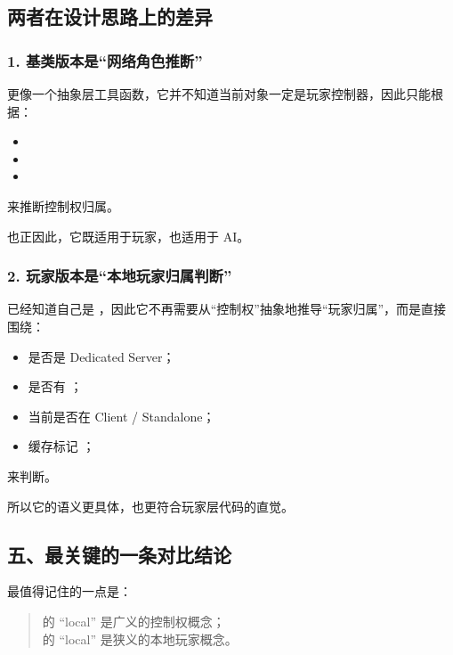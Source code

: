 \subsection{两者在设计思路上的差异}

\subsubsection*{1. 基类版本是“网络角色推断”}

 更像一个抽象层工具函数，它并不知道当前对象一定是玩家控制器，因此只能根据：

\begin{itemize}
	\item {}
	\item {}
	\item {}
\end{itemize}

来推断控制权归属。

也正因此，它既适用于玩家，也适用于 AI。

\subsubsection*{2. 玩家版本是“本地玩家归属判断”}

 已经知道自己是 ，因此它不再需要从“控制权”抽象地推导“玩家归属”，而是直接围绕：

\begin{itemize}
	\item 是否是 Dedicated Server；
	\item 是否有 ；
	\item 当前是否在 Client / Standalone；
	\item 缓存标记 ；
\end{itemize}

来判断。

所以它的语义更具体，也更符合玩家层代码的直觉。

\subsection{五、最关键的一条对比结论}

最值得记住的一点是：

\begin{quote}
	 的 “local” 是广义的控制权概念；\\
	 的 “local” 是狭义的本地玩家概念。
\end{quote}

